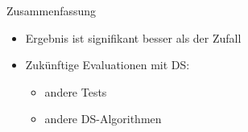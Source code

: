 

\begin{frame}
	{Zusammenfassung}
  \begin{itemize}
  \item Ergebnis ist signifikant besser als der Zufall
%	
	\item Zukünftige Evaluationen mit DS:
	  \begin{itemize}
		  \item andere Tests
		  \item andere DS-Algorithmen
	  \end{itemize}
	
	\end{itemize}
\end{frame}

